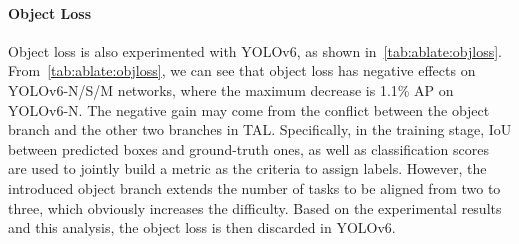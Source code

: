 \documentclass[10pt,twocolumn,letterpaper]{article}
\begin{document}
\begin{table}[ht]
  \centering
\caption{Ablation study on probability loss functions.}
\label{tab:ablate:probloss}
\end{table}

\paragraph{Object Loss}
Object loss is also experimented with YOLOv6, as shown in~\cref{tab:ablate:objloss}. From~\cref{tab:ablate:objloss}, we can see that object loss has negative effects on YOLOv6-N/S/M networks, where the maximum decrease is 1.1\% AP on YOLOv6-N. The negative gain may come from the conflict between the object branch and the other two branches in TAL. Specifically, in the training stage, IoU between predicted boxes and ground-truth ones, as well as classification scores are used to jointly build a metric as the criteria to assign labels. However, the introduced object branch extends the number of tasks to be aligned from two to three, which obviously increases the difficulty. Based on the experimental results and this analysis, the object loss is then discarded in YOLOv6.
\end{document}
